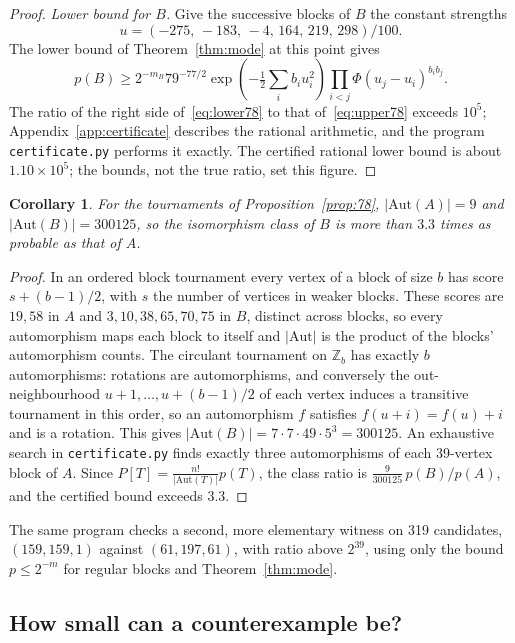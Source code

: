 \documentclass[11pt,a4paper]{article}
\newtheorem{corollary}[theorem]{Corollary}
\theoremstyle{definition}
\begin{document}
\begin{proof}
\emph{Lower bound for $B$.} Give the successive blocks of $B$ the constant strengths
\[
 u=(-275,\,-183,\,-4,\,164,\,219,\,298)/100 .
\]
The lower bound of Theorem~\ref{thm:mode} at this point gives
\begin{equation}\label{eq:lower78}
 p(B)\ge
 2^{-m_B}79^{-77/2}\exp\!\left(-\tfrac12\sum_i b_i u_i^2\right)
 \prod_{i<j}\Phi(u_j-u_i)^{b_i b_j}.
\end{equation}
The ratio of the right side of~\eqref{eq:lower78} to that of~\eqref{eq:upper78} exceeds $10^5$; Appendix~\ref{app:certificate} describes the rational arithmetic, and the program \texttt{certificate.py} performs it exactly. The certified rational lower bound is about $1.10\times10^5$; the bounds, not the true ratio, set this figure.
\end{proof}

\begin{corollary}\label{cor:classes}
For the tournaments of Proposition~\ref{prop:78}, $|\mathrm{Aut}(A)|=9$ and $|\mathrm{Aut}(B)|=300125$, so the isomorphism class of $B$ is more than $3.3$ times as probable as that of $A$.
\end{corollary}

\begin{proof}
In an ordered block tournament every vertex of a block of size $b$ has score $s+(b-1)/2$, with $s$ the number of vertices in weaker blocks. These scores are $19,58$ in $A$ and $3,10,38,65,70,75$ in $B$, distinct across blocks, so every automorphism maps each block to itself and $|\mathrm{Aut}|$ is the product of the blocks' automorphism counts. The circulant tournament on $\mathbb Z_b$ has exactly $b$ automorphisms: rotations are automorphisms, and conversely the out-neighbourhood $u+1,\dots,u+(b-1)/2$ of each vertex induces a transitive tournament in this order, so an automorphism $f$ satisfies $f(u+i)=f(u)+i$ and is a rotation. This gives $|\mathrm{Aut}(B)|=7\cdot7\cdot49\cdot5^3=300125$. An exhaustive search in \texttt{certificate.py} finds exactly three automorphisms of each 39-vertex block of $A$. Since $P[T]=\frac{n!}{|\mathrm{Aut}(T)|}p(T)$, the class ratio is $\frac{9}{300125}\,p(B)/p(A)$, and the certified bound exceeds $3.3$.
\end{proof}

The same program checks a second, more elementary witness on 319 candidates, $(159,159,1)$ against $(61,197,61)$, with ratio above $2^{39}$, using only the bound $p\le 2^{-m}$ for regular blocks and Theorem~\ref{thm:mode}.

\subsection{How small can a counterexample be?}\label{sec:small}
\end{document}
